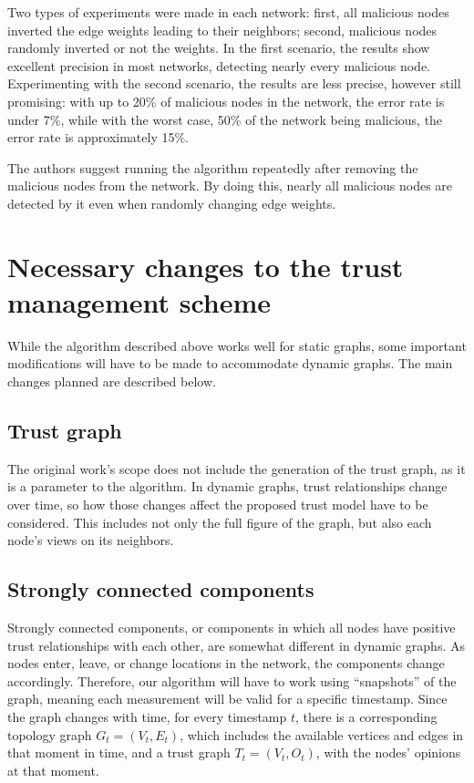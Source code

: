 Two types of experiments were made in each network: first, all malicious nodes inverted the edge weights leading to their neighbors; second, malicious nodes randomly inverted or not the weights.
In the first scenario, the results show excellent precision in most networks, detecting nearly every malicious node.
Experimenting with the second scenario, the results are less precise, however still promising: with up to 20\% of malicious nodes in the network, the error rate is under 7\%, while with the worst case, 50\% of the network being malicious, the error rate is approximately 15\%.

The authors suggest running the algorithm repeatedly after removing the malicious nodes from the network.
By doing this, nearly all malicious nodes are detected by it even when randomly changing edge weights. 


%
%
%
%


\section{Necessary changes to the trust management scheme}
\label{section:changes}
While the algorithm described above works well for static graphs, some important modifications will have to be made to accommodate dynamic graphs.
The main changes planned are described below.

\subsection{Trust graph}
The original work's scope does not include the generation of the trust graph, as it is a parameter to the algorithm.
In dynamic graphs, trust relationships change over time, so how those changes affect the proposed trust model have to be considered.
This includes not only the full figure of the graph, but also each node's views on its neighbors.

\subsection{Strongly connected components}
Strongly connected components, or components in which all nodes have positive trust relationships with each other, are somewhat different in dynamic graphs.
As nodes enter, leave, or change locations in the network, the components change accordingly.
Therefore, our algorithm will have to work using ``snapshots'' of the graph, meaning each measurement will be valid for a specific timestamp.
Since the graph changes with time, for every timestamp $t$, there is a corresponding topology graph $G_t=(V_t, E_t)$, which includes the available vertices and edges in that moment in time, and a trust graph $T_t=(V_t, O_t)$, with the nodes' opinions at that moment.

